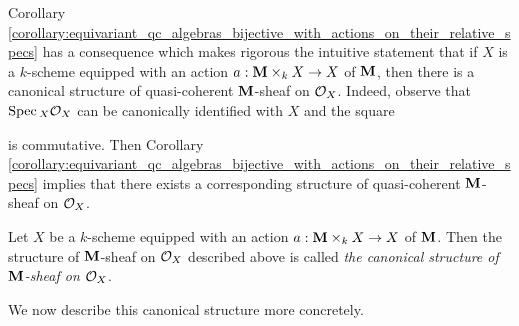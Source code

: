 \noindent
Corollary \ref{corollary:equivariant_qc_algebras_bijective_with_actions_on_their_relative_specs} has a consequence which makes rigorous the intuitive statement that if $X$ is a $k$-scheme equipped with an action $a:\mathbf{M}\times_kX\rightarrow X$ of $\mathbf{M}$, then there is a canonical structure of quasi-coherent $\mathbf{M}$-sheaf on ${\mathcal O}_X$. Indeed, observe that $\mathrm{Spec}\,_X{\mathcal O}_X$ can be canonically identified with $X$ and the square
\begin{center}
\end{center}
is commutative. Then Corollary \ref{corollary:equivariant_qc_algebras_bijective_with_actions_on_their_relative_specs} implies that there exists a corresponding structure of quasi-coherent $\mathbf{M}$-sheaf on ${\mathcal O}_X$.

\begin{definition}
Let $X$ be a $k$-scheme equipped with an action $a:\mathbf{M}\times_kX\rightarrow X$ of $\mathbf{M}$. Then the structure of $\mathbf{M}$-sheaf on ${\mathcal O}_X$ described above is called \textit{the canonical structure of $\mathbf{M}$-sheaf on ${\mathcal O}_X$}.
\end{definition}
\noindent
We now describe this canonical structure more concretely.

